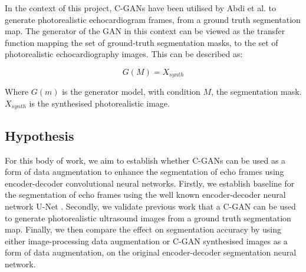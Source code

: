 In the context of this project, C-GANs have been utilised by Abdi et al.
\cite{abdiGANenhancedConditionalEchocardiogram2019} to generate photorealistic
echocardiogram frames, from a ground truth segmentation map. The generator of
the GAN in this context can be viewed as the transfer function mapping the set of
ground-truth segmentation masks, to the set of photorealistic echocardiography
images. This can be described as: \newline

\begin{equation}
    G(M) = X_{synth}
\end{equation} \newline

Where $G(m)$ is the generator model, with condition $M$, the segmentation mask.
$X_{synth}$ is the synthesised photorealistic image.\newline 

\subsection{Hypothesis}

For this body of work, we aim to establish whether C-GANs can be used as a form
of data augmentation to enhance the segmentation of echo frames using
encoder-decoder convolutional neural networks. Firstly, we establish baseline for
the segmentation of echo frames using the well known encoder-decoder neural
network U-Net \cite{ronneberger2015u}. Secondly, we validate previous work that a C-GAN can be used to
generate photorealistic ultrasound images from a ground truth segmentation map.
Finally, we then compare the effect on segmentation accuracy by using either
image-processing data augmentation or C-GAN synthesised images as a form of data
augmentation, on the original encoder-decoder segmentation neural network. \newline